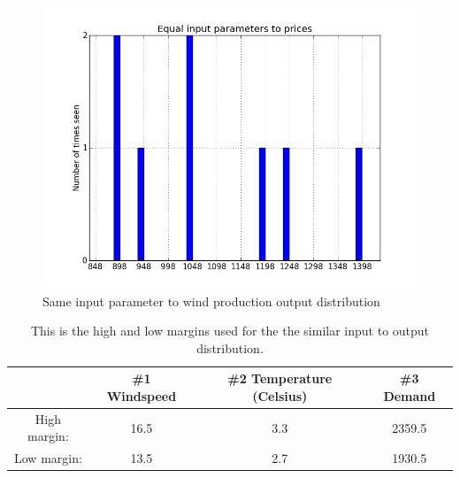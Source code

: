 \begin{figure}[H]
\centering
\includegraphics[width=0.99\linewidth,natwidth=898,natheight=587]{billeder/Equal_wind.png}
\caption{Same input parameter to wind production output distribution}
\label{fig:inputParameterDistribution}
\end{figure}

\begin{table}[H]
\centering  %
\begin{tabular}{c c c c} %
 & \#1 Windspeed & \#2 Temperature (Celsius) & \#3 Demand \\ [0.5ex] %
\hline                  %
High margin: & 16.5 & 3.3 & 2359.5  \\
Low margin: & 13.5 & 2.7 & 1930.5 \\ [1ex] %
\hline %
\end{tabular}
\caption{This is the high and low margins used for the the similar input to output distribution.} %
\label{table:similarHoursLimitsWindProd} %
\end{table}


